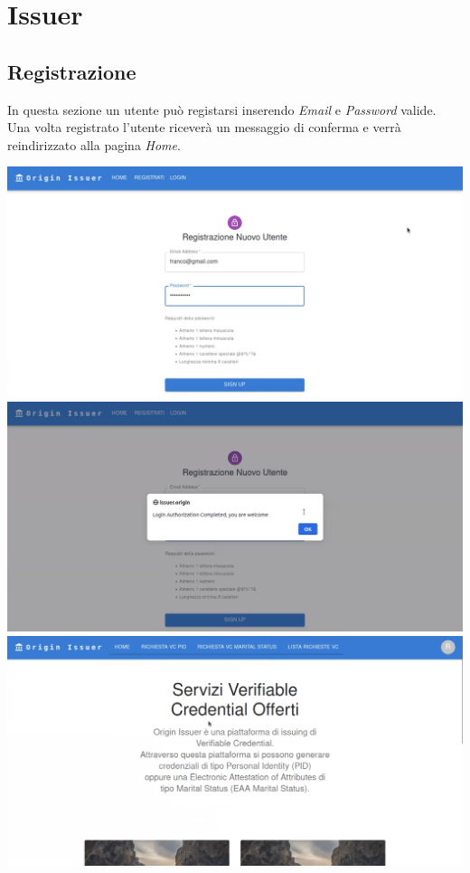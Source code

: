 \section{Issuer}

\subsection{Registrazione}
In questa sezione un utente può registarsi inserendo \textit{Email} e \textit{Password} valide. Una volta registrato l'utente riceverà un messaggio di conferma e verrà reindirizzato alla pagina \textit{Home}.
\begin{center}
\includegraphics[scale = 0.2]{./res/img/issuer/registrazione/registrazione1.png}
\includegraphics[scale = 0.2]{./res/img/issuer/registrazione/registrazione2.png}
\includegraphics[scale = 0.2]{./res/img/issuer/registrazione/registrazione3.png}
\end{center}

